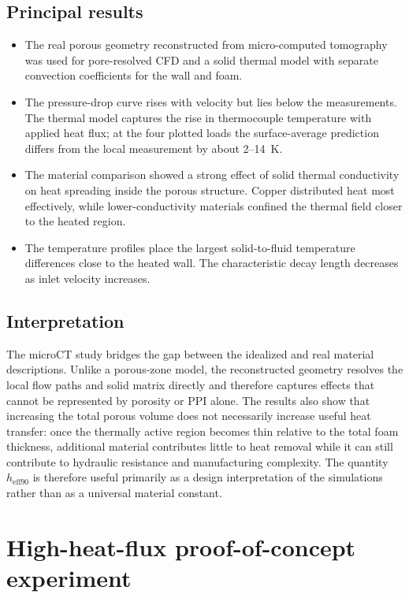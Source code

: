 \documentclass[a4paper]{article}
\begin{document}
\subsection*{Principal results}
\begin{itemize}
    \item The real porous geometry reconstructed from micro-computed tomography was used for pore-resolved CFD and a solid thermal model with separate convection coefficients for the wall and foam.
    \item The pressure-drop curve rises with velocity but lies below the measurements. The thermal model captures the rise in thermocouple temperature with applied heat flux; at the four plotted loads the surface-average prediction differs from the local measurement by about 2--14~K.
    \item The material comparison showed a strong effect of solid thermal conductivity on heat spreading inside the porous structure. Copper distributed heat most effectively, while lower-conductivity materials confined the thermal field closer to the heated region.
    \item The temperature profiles place the largest solid-to-fluid temperature differences close to the heated wall. The characteristic decay length decreases as inlet velocity increases.
\end{itemize}

\subsection*{Interpretation}
The microCT study bridges the gap between the idealized and real material descriptions. Unlike a porous-zone model, the reconstructed geometry resolves the local flow paths and solid matrix directly and therefore captures effects that cannot be represented by porosity or PPI alone. The results also show that increasing the total porous volume does not necessarily increase useful heat transfer: once the thermally active region becomes thin relative to the total foam thickness, additional material contributes little to heat removal while it can still contribute to hydraulic resistance and manufacturing complexity. The quantity $h_{\mathrm{eff90}}$ is therefore useful primarily as a design interpretation of the simulations rather than as a universal material constant.

\section{High-heat-flux proof-of-concept experiment}
\end{document}
